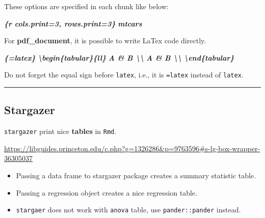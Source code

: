 \documentclass[
  a4paper,
  twoside,
  openright]{book}
\newenvironment{Shaded}{\begin{snugshade}}{\end{snugshade}}
\newcommand{\InformationTok}[1]{\textcolor[rgb]{0.56,0.35,0.01}{\textbf{\textit{#1}}}}
\theoremstyle{definition}
\theoremstyle{definition}
\theoremstyle{definition}
\theoremstyle{definition}
\theoremstyle{remark}
\begin{document}
These options are specified in each chunk like below:

\begin{Shaded}
\begin{Highlighting}[]
\InformationTok{\textasciigrave{}\textasciigrave{}\textasciigrave{}\{r cols.print=3, rows.print=3\}}
\InformationTok{mtcars}
\InformationTok{\textasciigrave{}\textasciigrave{}\textasciigrave{}}
\end{Highlighting}
\end{Shaded}

For \textbf{pdf\_document}, it is possible to write LaTex code directly.

\begin{Shaded}
\begin{Highlighting}[]
\InformationTok{\textasciigrave{}\textasciigrave{}\textasciigrave{}\{=latex\}}
\InformationTok{\textbackslash{}begin\{tabular\}\{ll\}}
\InformationTok{A \& B \textbackslash{}\textbackslash{}}
\InformationTok{A \& B \textbackslash{}\textbackslash{}}
\InformationTok{\textbackslash{}end\{tabular\}}
\InformationTok{\textasciigrave{}\textasciigrave{}\textasciigrave{}}
\end{Highlighting}
\end{Shaded}

Do not forget the equal sign before \texttt{latex}, i.e., it is \texttt{=latex} instead of \texttt{latex}.

\begin{center}\rule{0.5\linewidth}{0.5pt}\end{center}

\subsection{Stargazer}\label{stargazer}

\texttt{stargazer} print nice \textbf{tables} in \texttt{Rmd}.

\url{https://libguides.princeton.edu/c.php?g=1326286&p=9763596\#s-lg-box-wrapper-36305037}

\begin{itemize}
\item
  Passing a data frame to stargazer package creates a {summary statistic table}.
\item
  Passing a regression object creates a nice {regression table}.\\
\item
  \texttt{stargaer} does not work with \texttt{anova} table, use \texttt{pander::pander} instead.
\end{itemize}
\end{document}
